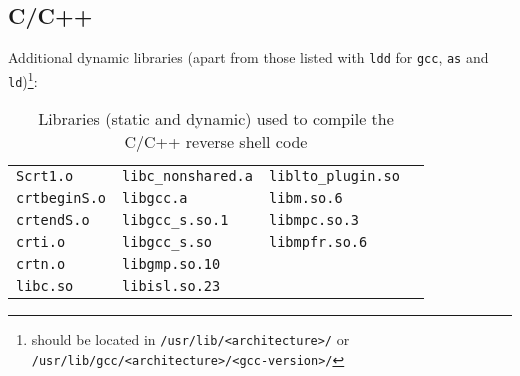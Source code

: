 \newpage

\subsection*{C/C++}


Additional dynamic libraries (apart from those listed with \texttt{ldd} for \texttt{gcc}, \texttt{as} and \texttt{ld})\footnote{should be located in \texttt{/usr/lib/<architecture>/} or \texttt{/usr/lib/gcc/<architecture>/<gcc-version>/}}:

\begin{longtable}{l l l l}
\caption{Libraries (static and dynamic) used to compile the C/C++ reverse shell code}\label{tab:c-dpd-lib} \\
\texttt{Scrt1.o} & \texttt{libc\_nonshared.a} & \texttt{liblto\_plugin.so} \\
\texttt{crtbeginS.o} & \texttt{libgcc.a} & \texttt{libm.so.6} \\
\texttt{crtendS.o} & \texttt{libgcc\_s.so.1} & \texttt{libmpc.so.3} \\
\texttt{crti.o} & \texttt{libgcc\_s.so} & \texttt{libmpfr.so.6} \\
\texttt{crtn.o} & \texttt{libgmp.so.10} &  \\
\texttt{libc.so} & \texttt{libisl.so.23} &  \\
\end{longtable}


